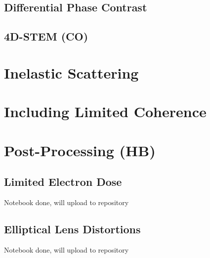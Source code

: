 \documentclass[%
 superscriptaddress,
 aip,
 amsmath,amssymb,
preprint,%
 author-year,%
longbibliography
]{revtex4-2}
\begin{document}

\subsection*{Differential Phase Contrast}




\subsection*{4D-STEM (CO)}


\section*{Inelastic Scattering}

\section*{Including Limited Coherence}





\section*{Post-Processing (HB)}

\subsection*{Limited Electron Dose}

Notebook done, will upload to repository

\subsection*{Elliptical Lens Distortions}

Notebook done, will upload to repository
\end{document}
